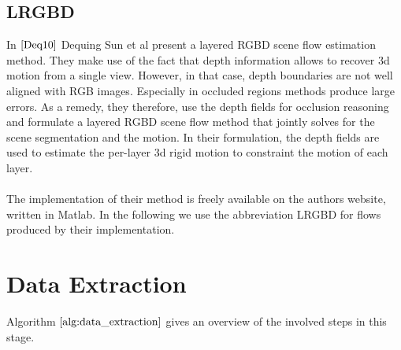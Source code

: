 \subsection{LRGBD}
In $\cite{Deq10}$ Dequing Sun et al present a layered RGBD scene flow estimation  method. They make use of the fact that depth information allows to recover 3d motion from a single view. However, in that case, depth boundaries are not well aligned with RGB images. Especially in occluded regions methods produce large errors. As a remedy, they therefore, use the depth fields for occlusion reasoning and formulate a layered RGBD scene flow method that jointly solves for the scene segmentation and the motion. In their formulation, the depth fields are used to estimate the per-layer 3d rigid motion to constraint the motion of each layer. \\ \\
The implementation of their method is freely available on the authors website, written in Matlab. In the following we use the abbreviation LRGBD for flows produced by their implementation.


\section{Data Extraction}


Algorithm $\ref{alg:data_extraction}$ gives an overview of the involved steps in this stage.

